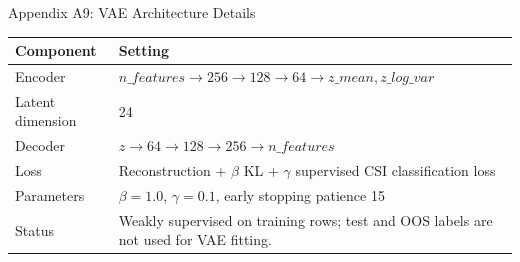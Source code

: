 \documentclass[10pt]{beamer}\usepackage[]{graphicx}\usepackage[table]{xcolor}
\begin{document}
\begin{frame}{Appendix A9: VAE Architecture Details}
\scriptsize
\begin{table}[ht]
\centering
\begin{tabular}{L{3.2cm}L{7.2cm}}
\toprule
Component & Setting \\
\midrule
Encoder & $n\_features \rightarrow 256 \rightarrow 128 \rightarrow 64 \rightarrow z\_mean,z\_log\_var$ \\
Latent dimension & 24 \\
Decoder & $z \rightarrow 64 \rightarrow 128 \rightarrow 256 \rightarrow n\_features$ \\
Loss & Reconstruction + $\beta$ KL + $\gamma$ supervised CSI classification loss \\
Parameters & $\beta=1.0$, $\gamma=0.1$, early stopping patience 15 \\
Status & Weakly supervised on training rows; test and OOS labels are not used for VAE fitting. \\
\bottomrule
\end{tabular}
\end{table}
\end{frame}
\end{document}
